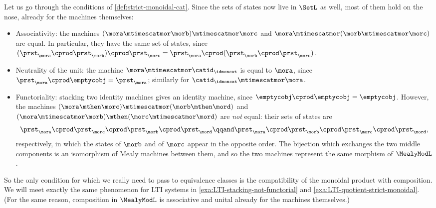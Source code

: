 \begin{example}
    Let us go through the conditions of \cref{def:strict-monoidal-cat}.
    Since the sets of states now live in $\SetL$ as well, most of them hold on the nose, already for the machines themselves:
    \begin{itemize}
        \item Associativity: the machines $(\mora \mtimescatmor \morb) \mtimescatmor \morc$ and $\mora \mtimescatmor (\morb \mtimescatmor \morc)$ are equal.
              In particular, they have the same set of states, since $(\prst_{\mora} \cprod \prst_{\morb}) \cprod \prst_{\morc} = \prst_{\mora} \cprod (\prst_{\morb} \cprod \prst_{\morc})$.
        \item Neutrality of the unit: the machine $\mora \mtimescatmor \catid_\idmoncat$ is equal to $\mora$, since $\prst_{\mora} \cprod \emptycobj = \prst_{\mora}$; similarly for $\catid_\idmoncat \mtimescatmor \mora$.
        \item Functoriality: stacking two identity machines gives an identity machine, since $\emptycobj \cprod \emptycobj = \emptycobj$.
              However, the machines $(\mora \mthen \morc) \mtimescatmor (\morb \mthen \mord)$ and $(\mora \mtimescatmor \morb) \mthen (\morc \mtimescatmor \mord)$ are \emph{not} equal: their sets of states are
              \begin{equation}
                  \label{eq:mealyL-interchange-states}
                  \prst_{\mora} \cprod \prst_{\morc} \cprod \prst_{\morb} \cprod \prst_{\mord}
                  \qqand
                  \prst_{\mora} \cprod \prst_{\morb} \cprod \prst_{\morc} \cprod \prst_{\mord},
              \end{equation}
              respectively, in which the states of $\morb$ and of $\morc$ appear in the opposite order.
              The bijection which exchanges the two middle components is an isomorphism of Mealy machines between them, and so the two machines represent the same morphism of $\MealyModL$.
    \end{itemize}
    So the only condition for which we really need to pass to equivalence classes is the compatibility of the monoidal product with composition.
    We will meet exactly the same phenomenon for LTI systems in \cref{exa:LTI-stacking-not-functorial} and \cref{exa:LTI-quotient-strict-monoidal}.
    (For the same reason, composition in $\MealyModL$ is associative and unital already for the machines themselves.)
\end{example}

